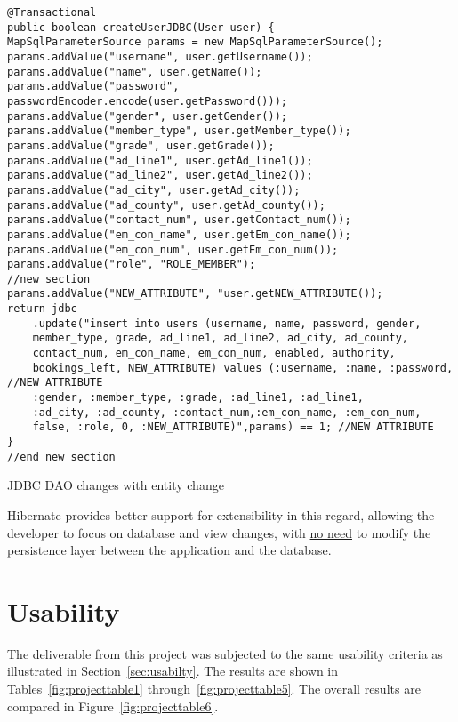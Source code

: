 \begin{lstlisting}
@Transactional
public boolean createUserJDBC(User user) {
MapSqlParameterSource params = new MapSqlParameterSource();
params.addValue("username", user.getUsername());
params.addValue("name", user.getName());
params.addValue("password", passwordEncoder.encode(user.getPassword()));
params.addValue("gender", user.getGender());
params.addValue("member_type", user.getMember_type());
params.addValue("grade", user.getGrade());
params.addValue("ad_line1", user.getAd_line1());
params.addValue("ad_line2", user.getAd_line2());
params.addValue("ad_city", user.getAd_city());
params.addValue("ad_county", user.getAd_county());
params.addValue("contact_num", user.getContact_num());
params.addValue("em_con_name", user.getEm_con_name());
params.addValue("em_con_num", user.getEm_con_num());
params.addValue("role", "ROLE_MEMBER");
//new section
params.addValue("NEW_ATTRIBUTE", "user.getNEW_ATTRIBUTE());
return jdbc
	.update("insert into users (username, name, password, gender, 
	member_type, grade, ad_line1, ad_line2, ad_city, ad_county,
	contact_num, em_con_name, em_con_num, enabled, authority,
	bookings_left, NEW_ATTRIBUTE) values (:username, :name, :password, //NEW ATTRIBUTE 
	:gender, :member_type, :grade, :ad_line1, :ad_line1, 
	:ad_city, :ad_county, :contact_num,:em_con_name, :em_con_num,
	false, :role, 0, :NEW_ATTRIBUTE)",params) == 1; //NEW ATTRIBUTE
}
//end new section
\end{lstlisting}
\begin{table}[H]
\caption{JDBC DAO changes with entity change}
\label{fig:jdbcChanges}
\end{table}

Hibernate provides better support for extensibility in this regard, allowing the developer to focus on database and view changes, with \uline{no need} to modify the persistence layer between the application and the database.

\section{Usability}

The deliverable from this project was subjected to the same usability criteria as illustrated in Section~\ref{sec:usabilty}. The results are shown in Tables~\ref{fig:projecttable1} through~\ref{fig:projecttable5}. The overall results are compared in Figure~\ref{fig:projecttable6}.

